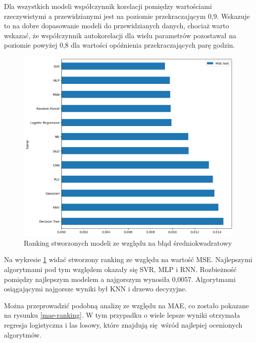Dla wszystkich modeli współczynnik korelacji pomiędzy wartościami rzeczywistymi 
a przewidzianymi jest na poziomie przekraczającym 0,9. Wskazuje to na dobre dopasowanie
modeli do przewidzianych danych, chociaż warto wskazać, że współczynnik
autokorelacji dla wielu parametrów pozostawał na poziomie powyżej 0,8 dla wartości
opóźnienia przekraczających parę godzin.

\begin{figure}[H]
    \centering
    \includegraphics[width=\textwidth]{images/mse_ranking.png}
    \caption{Ranking stworzonych modeli ze względu na błąd średniokwadratowy}
    \label{mse-ranking}
\end{figure}

Na wykresie \ref{mse-ranking} widać stworzony ranking ze względu na wartość MSE.
Najlepszymi algorytmami pod tym względem okazały się SVR, MLP i RNN. Rozbieżność 
pomiędzy najlepszym modelem a najgorszym wynosiła 0,0057. Algorytmami 
osiągającymi najgorsze wyniki był KNN i drzewo decyzyjne.

Można przeprowadzić podobną analizę ze względu na MAE, co zostało pokazane na 
rysunku \ref{mae-ranking}. W tym przypadku o wiele lepsze wyniki 
otrzymała regresja logistyczna i las losowy, które znajdują się wśród najlepiej 
ocenionych algorytmów.

